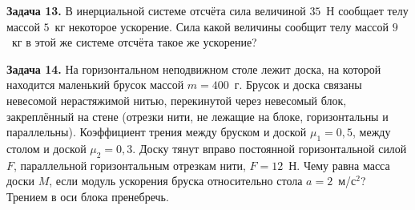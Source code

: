 \begin{taskbasic}[code={\label{task:newton2_v19_n2}}]
\textbf{Задача 13.} В инерциальной системе отсчёта сила величиной $35$~Н сообщает телу массой $5$~кг некоторое ускорение. Сила какой величины сообщит телу массой $9$~кг в этой же системе отсчёта такое же ускорение?

\end{taskbasic}

\begin{taskbasic}[code={\label{task:newton2_v19_n26}}]
\textbf{Задача 14.} На горизонтальном неподвижном столе лежит доска, на которой находится маленький брусок массой $m=400$~г. Брусок и доска связаны невесомой нерастяжимой нитью, перекинутой через невесомый блок, закреплённый на стене (отрезки нити, не лежащие на блоке, горизонтальны и параллельны). Коэффициент трения между бруском и доской $\mu_1=0{,}5$, между столом и доской $\mu_2=0{,}3$. Доску тянут вправо постоянной горизонтальной силой $F$, параллельной горизонтальным отрезкам нити, $F=12$~Н. Чему равна масса доски $M$, если модуль ускорения бруска относительно стола $a=2$~м/с$^{2}$? Трением в оси блока пренебречь.

\nopagebreak\smallskip
\begin{center}
\end{center}

\end{taskbasic}
